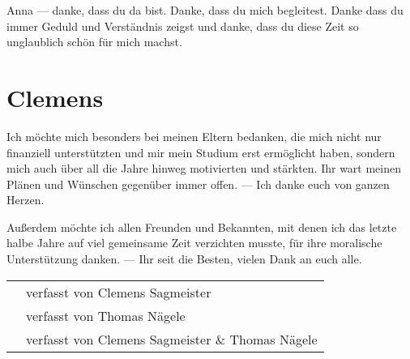 Anna --- danke, dass du da bist. Danke, dass du mich begleitest. Danke dass du immer Geduld und Verständnis zeigst und danke, dass du diese Zeit so unglaublich schön für mich machst. 

\vfill

\section*{Clemens}
Ich möchte mich besonders bei meinen Eltern bedanken, die mich nicht nur finanziell unterstützten und mir mein Studium erst ermöglicht haben, sondern mich auch über all die Jahre hinweg motivierten und stärkten. Ihr wart meinen Plänen und Wünschen gegenüber immer offen. --- Ich danke euch von ganzen Herzen.

Außerdem möchte ich allen Freunden und Bekannten, mit denen ich das letzte halbe Jahre auf viel gemeinsame Zeit verzichten musste, für ihre moralische Unterstützung danken. --- Ihr seit die Besten, vielen Dank an euch alle.

\endgroup


\hfill

\vfill

\vspace*{0.5cm}

\begin{center}
\begin{footnotesize}
	\textcolor{Gray}{
		\begin{tabular}{rp{7cm}}
			\cs & verfasst von Clemens Sagmeister \\
			\tn & verfasst von Thomas Nägele \\
			\cs \tn & verfasst von Clemens Sagmeister \& Thomas Nägele \\
		\end{tabular} }
\end{footnotesize}
\end{center}


